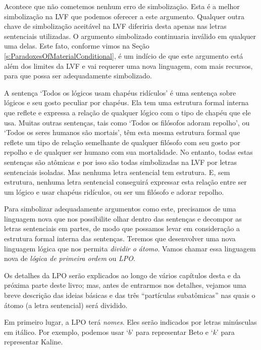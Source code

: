 Acontece que não cometemos nenhum erro de simbolização.
Esta é a melhor simbolização na LVF que podemos oferecer a este argumento.
Qualquer outra chave de simbolização aceitável na LVF diferiria desta apenas nas letras sentenciais utilizadas.
O argumento simbolizado continuaria inválido em qualquer uma delas.
Este fato, conforme vimos na Seção \ref{s:ParadoxesOfMaterialConditional}, é um indício de que este argumento está além dos limites da LVF e vai requerer uma nova linguagem, com mais recursos, para que possa ser adequadamente simbolizado.

A sentença `Todos os lógicos usam chapéus ridículos' é uma sentença sobre lógicos e seu gosto peculiar por chapéus.
Ela tem uma estrutura formal interna que reflete e expressa a relação de qualquer lógico com o tipo de chapéu que ele usa.
Muitas outras sentenças, tais como `Todos os filósofos adoram repolho', ou  `Todos os seres humanos são mortais', têm esta mesma estrutura formal que reflete um tipo de relação semelhante de qualquer filósofo com seu gosto por repolho e de qualquer ser humano com sua mortalidade. 
No entanto, todas estas sentenças são atômicas e por isso são todas simbolizadas na LVF por letras sentenciais isoladas.
Mas nenhuma letra sentencial tem estrutura.
E, sem estrutura, nenhuma letra sentencial conseguirá expressar esta relação entre ser um lógico e usar chapéus ridículos, ou ser um filósofo e adorar repolho.

Para simbolizar adequadamente argumentos como este, precisamos de uma linguagem nova que nos possibilite olhar dentro das sentenças e decompor as letras sentenciais em partes, de modo que possamos levar em consideração a estrutura formal interna das sentenças.
Teremos que desenvolver uma nova linguagem lógica que nos permita \emph{dividir o átomo}.
Vamos chamar essa linguagem nova de \emph{lógica de primeira ordem} ou \emph{LPO}.

Os detalhes da LPO serão explicados ao longo de vários capítulos desta e da próxima parte deste livro; mas, antes de entrarmos nos detalhes, vejamos uma breve descrição das ideias básicas e das três ``partículas subatômicas'' nas quais  o átomo (a letra sentencial) será dividido.

Em primeiro lugar, a LPO terá \emph{nomes}.
Eles serão indicados por letras minúsculas em itálico.
Por exemplo, podemos usar `$b$' para representar Beto e `$k$' para representar Kaline.

